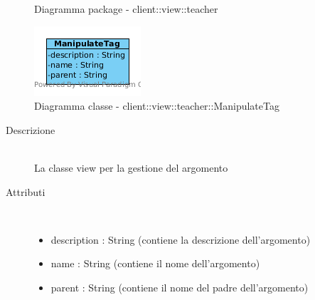 \begin{center}
\begin{figure}[H]
			\caption{Diagramma package - client::view::teacher}
		\end{figure}
	\end{center}\hypertarget{client::view::teacher::ManipulateTag}{}
\begin{center}
			\begin{figure}[H]
				\centering \includegraphics[scale=4, max width=\textwidth, max height=\myheight]{../img/diagrammiClassi/client/view/teacher/ManipulateTag.png}
				\caption{Diagramma classe - client::view::teacher::ManipulateTag}
			\end{figure}
		\end{center}\begin{description}
\item[Descrizione] \hfill \\
 La classe view per la gestione del argomento
\item[Attributi] \hfill \\
 \vspace{-7mm}
\begin{itemize}
\item description : String (contiene la descrizione dell'argomento)
\item name : String (contiene il nome dell'argomento)
\item parent : String (contiene il nome del padre dell'argomento)
\end{itemize}

\end{description}

